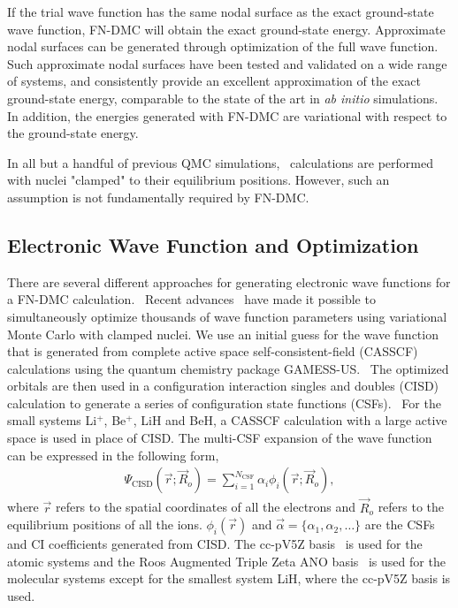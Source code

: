\documentclass[aip,jcp,numerical,reprint]{revtex4-1}
\begin{document}
If the trial wave function has the same nodal surface as the exact ground-state wave function, FN-DMC will obtain the exact ground-state energy.  Approximate nodal surfaces can be generated through optimization of the full wave function. Such approximate nodal surfaces have been tested and validated on a wide range of systems, and consistently provide an excellent approximation of the exact ground-state energy, comparable to the state of the art in \textit{ab initio} simulations.~\cite{grossman1} In addition, the energies generated with FN-DMC are variational with respect to the ground-state energy.

In all but a handful of previous QMC simulations,~\cite{Ceperley_1987,Natoli_1993,Natoli_1995,Chen_1995,Coldwell_H2_2008,Gabriele_H2_2004,Sandro_finiteT-noBO_2012} calculations are performed with nuclei "clamped" to their equilibrium positions. However, such an assumption is not fundamentally required by FN-DMC. %

\subsection{Electronic Wave Function and Optimization}

There are several different approaches for generating electronic wave functions for a FN-DMC calculation.~\cite{Umrigar_Alleviation,Toulouse_Bench,Brown_Bench,Seth_Bench} Recent advances~\cite{Nightingale_Linear,Umrigar_Linear,Brown_Bench} have made it possible to simultaneously optimize thousands of wave function parameters using variational Monte Carlo with clamped nuclei. We use an initial guess for the wave function that is generated from complete active space self-consistent-field (CASSCF)~\cite{Chaban_MCSCF,Szabo} calculations using the quantum chemistry package GAMESS-US.~\cite{GAMESS} The optimized orbitals are then used in a configuration interaction singles and doubles (CISD) calculation to generate a series of configuration state functions (CSFs).~\cite{Pauncz_CSF} For the small systems Li$^+$, Be$^+$, LiH and BeH, a CASSCF calculation with a large active space is used in place of CISD. The multi-CSF expansion of the wave function can be expressed in the following form,
\begin{align}
\Psi_{\text{CISD}}(\vec{r};\vec{R}_o)=\sum\limits_{i=1}^{N_{\text{CSF}}}\alpha_i\phi_i(\vec{r};\vec{R}_o), \label{eq:psi_gms}
\end{align}
where $\vec{r}$ refers to the spatial coordinates of all the electrons and $\vec{R}_o$ refers to the equilibrium positions of all the ions. $\phi_i(\vec{r})$ and $\vec{\alpha}=\{\alpha_1,\alpha_2,\dots\}$ are the CSFs and CI coefficients generated from CISD. The cc-pV5Z basis~\cite{dunning} is used for the atomic systems and the Roos Augmented Triple Zeta ANO basis~\cite{roos} is used for the molecular systems except for the smallest system LiH, where the cc-pV5Z basis is used.
\end{document}
